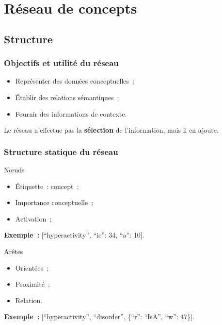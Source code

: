\documentclass[12pt, handout]{beamer}
\begin{document}
\section{Réseau de concepts}

\subsection{Structure}

\begin{frame}
 \frametitle{Objectifs et utilité du réseau}
 
 \begin{itemize}
  \item Représenter des données conceptuelles~;
  \item Établir des relations sémantiques~;
  \item Fournir des informations de contexte.
 \end{itemize}
 
 Le réseau n'effectue pas la \textbf{sélection} de l'information, mais il en ajoute.
 
\end{frame}


\begin{frame}[allowframebreaks = 0.7, fragile]
 \frametitle{Structure statique du réseau}
 
 \begin{block}{N\oe{}uds}
\begin{itemize}
 \item Étiquette~: concept~;
 \item Importance conceptuelle~;
 \item Activation~;
\end{itemize}

\textbf{Exemple~:} [``hyperactivity'', ``ic'': 34, ``a'': 10].

\end{block}
 
\begin{block}{Arêtes}
 \begin{itemize}
  \item Orientées~;
  \item Proximité~;
  \item Relation.
 \end{itemize}

\textbf{Exemple~:} [``hyperactivity'', ``disorder'', \{``r'': ``IsA'', ``w'': 47\}].
 
\end{block}

 
\end{frame}
\end{document}
